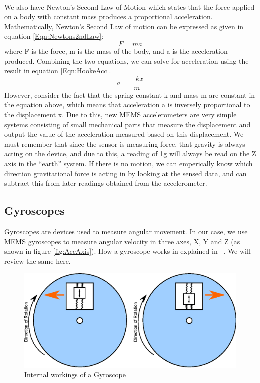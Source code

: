 \hfill \\
We also have Newton's Second Law of Motion
which states that the force applied on a body with constant mass produces a proportional acceleration.
Mathematically, Newton's Second Law of motion can be expressed as given in equation \ref{Eqn:Newtons2ndLaw}:
\begin{equation}
\label{Eqn:Newtons2ndLaw}
F = ma 
\end{equation}
where F is the force, m is the mass of the body, and a is the acceleration produced. Combining the two equations, we can solve for acceleration using the result in equation \ref{Eqn:HookeAcc}.
\begin{equation}
\label{Eqn:HookeAcc}
a = \frac{-kx}{m} 
\end{equation}
However, consider the fact that the spring constant k and mass m are constant in the equation above, which means that acceleration a is inversely proportional to the displacement x. Due to this, new MEMS accelerometers are very simple systems consisting of small mechanical parts that measure the displacement and output the value of the acceleration measured based on this displacement.
We must remember that since the sensor is measuring force, that gravity is always acting on the device,
and due to this, a reading of 1g will always be read on the Z axis in the ``earth'' system.
If there is no motion, we can emperically know which direction gravitational force is acting in by looking at the sensed data,
and can subtract this from later readings obtained from the accelerometer.

\subsection{Gyroscopes}
\label{Sec:Gyroscope}

Gyroscopes are devices used to measure angular movement. In our case, we use MEMS gyroscopes to measure angular velocity in three axes, X, Y and Z (as shown in figure \ref{fig:AccAxis}). How a gyroscope works in explained in ~\cite{Web:SparkfunGyros}. We will review the same here.
\begin{figure}
\begin{center}
\includegraphics{images/GyroWork.eps}
\caption{Internal workings of a Gyroscope}
\label{fig:GyroDiag}
\end{center}
\end{figure}

